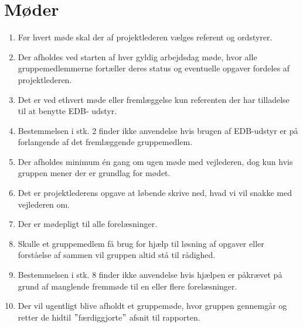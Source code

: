 \section{Møder}
\begin{enumerate}
\item{Før hvert møde skal der af projektlederen vælges referent og ordstyrer.}
\item{Der afholdes ved starten af hver gyldig arbejdsdag møde, hvor alle gruppemedlemmerne
fortæller deres status og eventuelle opgaver fordeles af projektlederen.}
\item{Det er ved ethvert møde eller fremlæggelse kun referenten der har tilladelse til at benytte EDB-
udstyr.}
\item{Bestemmelsen i stk. 2 finder ikke anvendelse hvis brugen af EDB-udstyr er på forlangende af det
fremlæggende gruppemedlem.}
\item{Der afholdes minimum én gang om ugen møde med vejlederen, dog kun hvis gruppen mener der
er grundlag for mødet.}
\item{Det er projektlederens opgave at løbende skrive ned, hvad vi vil snakke med vejlederen om.}
\item{Der er mødepligt til alle forelæsninger.}
\item{Skulle et gruppemedlem få brug for hjælp til løsning af opgaver eller forståelse af sammen vil
gruppen altid stå til rådighed.}
\item{Bestemmelsen i stk. 8 finder ikke anvendelse hvis hjælpen er påkrævet på grund af manglende
fremmøde til en eller flere forelæsninger.}
\item{Der vil ugentligt blive afholdt et gruppemøde, hvor gruppen gennemgår og retter de hidtil $"$færdiggjorte$"$ afsnit til rapporten.}
\end{enumerate}
